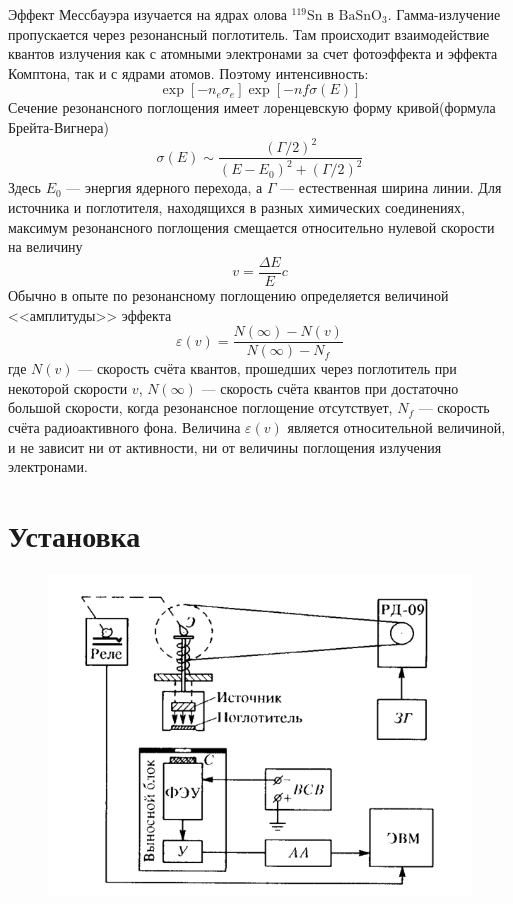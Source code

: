 \documentclass[a4paper,12pt]{article}
\newcommand{\eps}{\varepsilon}
\begin{document}
		Эффект Мессбауэра изучается на ядрах олова $\mathrm{^{119}Sn}$ в $\mathrm{BaSnO_3}$. Гамма-излучение пропускается через резонансный поглотитель. Там происходит взаимодействие квантов излучения как с атомными электронами за счет фотоэффекта и эффекта Комптона, так и с ядрами атомов. Поэтому интенсивность:
		\begin{equation}
			\exp\left[-n_e\sigma_e\right]\exp\left[-nf\sigma(E)\right]
		\end{equation}
		Сечение резонансного поглощения имеет лоренцевскую форму кривой(формула Брейта-Вигнера)
		\begin{equation}
			\sigma(E) \sim \frac{\left(\Gamma/2\right)^2}{\left(E-E_0\right)^2 + \left(\Gamma/2\right)^2}
		\end{equation}
		Здесь $E_0$ --- энергия ядерного перехода, а $\Gamma$ --- естественная ширина линии.
		Для источника и поглотителя, находящихся в разных химических соединениях, максимум резонансного поглощения смещается относительно нулевой скорости на величину
		\begin{equation}
			v = \frac{\Delta E}{E}c
		\end{equation}
		Обычно в опыте по резонансному поглощению определяется величиной <<амплитуды>> эффекта
		\begin{equation}
			\eps(v) = \frac{N(\infty)-N(v)}{N(\infty)-N_f}
		\end{equation}
		где $N(v)$ --- скорость счёта квантов, прошедших через поглотитель при некоторой скорости $v$, $N(\infty)$ --- скорость счёта квантов при достаточно большой скорости, когда резонансное поглощение отсутствует, $N_f$ --- скорость счёта радиоактивного фона. Величина $\eps(v)$ является относительной величиной, и не зависит ни от активности, ни от величины поглощения излучения электронами.
		\section{Установка}
		\begin{figure}[h!]
			\centering
			\includegraphics[width=0.95\linewidth]{scheme}
		\end{figure}
		
\end{document}
